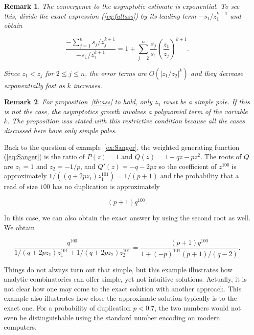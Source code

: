 \documentclass{article}
\newtheorem{remark}{Remark}
\begin{document}
\begin{remark}
The convergence to the asymptotic estimate is exponential. To see this,
divide the exact expression (\ref{eq:fullass}) by its leading term
$-s_1/z_1^{k+1}$ and obtain

\begin{equation*}
\frac{-\sum_{j=1}^n s_j/z_j^{k+1}}{-s_1/z_1^{k+1}} = 1 + \sum_{j=2}^n
\frac{s_j}{s_1} \left( \frac{z_1}{z_j} \right)^{k+1}.
\end{equation*}

Since $z_1 < z_j$ for $2 \leq j \leq n$, the error terms are
$O(|z_1/z_2|^k)$ and they decrease exponentially fast as $k$ increases.
\end{remark}

\begin{remark}
For proposition~\ref{th:ass} to hold, only $z_1$ must be a simple pole. If
this is not the case, the asymptotics growth involves a polynomial term of
the variable $k$. The proposition was stated with this restrictive
condition because all the cases discussed here have only simple poles.
\end{remark}

Back to the question of example~\ref{ex:Sanger}, the weighted generating
function (\ref{eq:Sanger}) is the ratio of $P(z) = 1$ and $Q(z) =
1-qz-pz^2$. The roots of $Q$ are $z_1 = 1$ and $z_2 = -1/p$, and $Q'(z) =
-q -2pz$ so the coefficient of $z^{100}$ is approximately
$1/((q+2pz_1)z_1^{101}) = 1/(p+1)$ and the probability that a read of size
$100$ has no duplication is approximately

\begin{equation*}
(p+1)q^{100}.
\end{equation*}

In this case, we can also obtain the exact answer by using the second root
as well. We obtain

\begin{equation*}
\frac{q^{100}}{1/(q+2pz_1)z_1^{101} + 1/(q+2pz_2)z_2^{101}} =
\frac{(p+1)q^{100}}{1+(-p)^{101}(p+1)/(q-2)}.
\end{equation*}

Things do not always turn out that simple, but this example illustrates
how analytic combinatorics can offer simple, yet not intuitive solutions.
Actually, it is not clear how one may come to the exact solution with
another approach. This example also illustrates how close the approximate
solution typically is to the exact one. For a probability of duplication
$p < 0.7$, the two numbers would not even be distinguishable using the
standard number encoding on modern computers.
\end{document}
